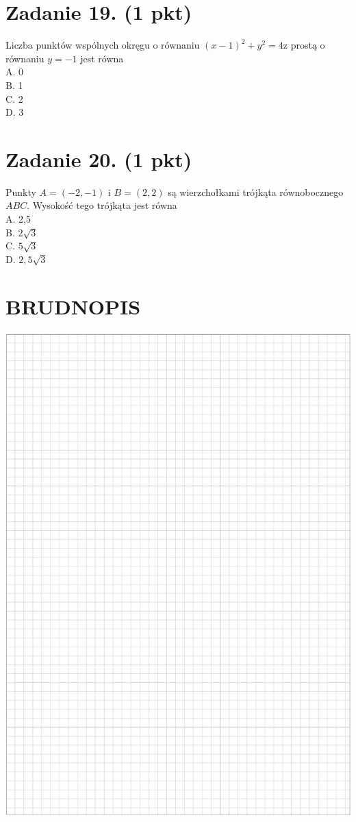\documentclass[10pt]{article}
\begin{document}
\section*{Zadanie 19. (1 pkt)}
Liczba punktów wspólnych okręgu o równaniu \((x-1)^{2}+y^{2}=4 \mathrm{z}\) prostą o równaniu \(y=-1\) jest równa\\
A. 0\\
B. 1\\
C. 2\\
D. 3

\section*{Zadanie 20. (1 pkt)}
Punkty \(A=(-2,-1)\) i \(B=(2,2)\) są wierzchołkami trójkąta równobocznego \(A B C\). Wysokość tego trójkąta jest równa\\
A. 2,5\\
B. \(2 \sqrt{3}\)\\
C. \(5 \sqrt{3}\)\\
D. \(2,5 \sqrt{3}\)

\section*{BRUDNOPIS}
\begin{center}
\includegraphics[max width=\textwidth]{2024_11_21_3a102e13f4b06a61f46fg-07}
\end{center}
\end{document}
